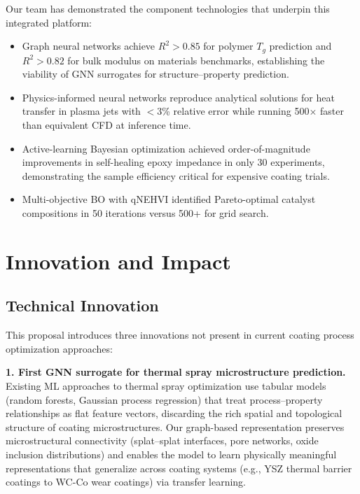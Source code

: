 \documentclass[11pt,letterpaper]{article}
\begin{document}
Our team has demonstrated the component technologies that underpin this
integrated platform:
\begin{itemize}[nosep]
  \item Graph neural networks achieve $R^2 > 0.85$ for polymer $T_g$
        prediction and $R^2 > 0.82$ for bulk modulus on materials
        benchmarks, establishing the viability of GNN surrogates for
        structure--property prediction.
  \item Physics-informed neural networks reproduce analytical solutions
        for heat transfer in plasma jets with $<$3\% relative error while
        running 500$\times$ faster than equivalent CFD at inference time.
  \item Active-learning Bayesian optimization achieved order-of-magnitude
        improvements in self-healing epoxy impedance in only 30
        experiments, demonstrating the sample efficiency critical for
        expensive coating trials.
  \item Multi-objective BO with qNEHVI identified Pareto-optimal catalyst
        compositions in 50 iterations versus 500+ for grid search.
\end{itemize}

\section{Innovation and Impact}
\label{sec:innovation}

\subsection{Technical Innovation}

This proposal introduces three innovations not present in current
coating process optimization approaches:

\textbf{1. First GNN surrogate for thermal spray microstructure
prediction.} Existing ML approaches to thermal spray optimization use
tabular models (random forests, Gaussian process regression) that treat
process--property relationships as flat feature vectors, discarding the
rich spatial and topological structure of coating microstructures. Our
graph-based representation preserves microstructural connectivity
(splat--splat interfaces, pore networks, oxide inclusion distributions)
and enables the model to learn physically meaningful representations
that generalize across coating systems (e.g., YSZ thermal barrier
coatings to WC-Co wear coatings) via transfer learning.
\end{document}
